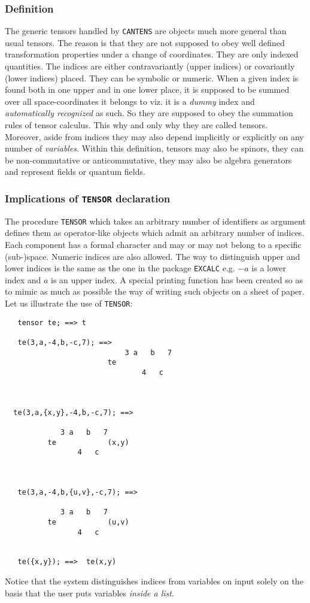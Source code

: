 \subsubsection{Definition}
The generic tensors  handled by \texttt{CANTENS} are objects
much more general than usual tensors. The reason is that they are not supposed to
obey well defined transformation properties under a change of coordinates.
They are only indexed quantities. The indices are either
contravariantly (upper indices) or covariantly (lower indices) placed.
They can be symbolic or numeric. When a given index is found both
in one upper and in one lower place, it is supposed to be summed over
all space-coordinates it belongs to viz. it is a \emph{dummy}
index
and \emph{automatically recognized} as such.
So they are supposed to obey the summation rules of tensor calculus.
This why and only why they are called tensors. Moreover, aside from
indices they may also depend implicitly or explicitly on any number of
\emph{variables}. Within this definition,
tensors may also be spinors, they can be non-commutative or anticommutative,
they may also be algebra generators and represent fields or quantum fields.

\subsubsection{Implications of \texttt{TENSOR} declaration}

The procedure \texttt{TENSOR} which takes an arbitrary number of identifiers as argument
defines them as operator-like objects which admit an arbitrary number of indices.
Each component has a formal character and may or may not belong to a
specific (sub-)space. Numeric indices are also allowed. The way to distinguish
upper and lower indices is the same as the one in the package
\texttt{EXCALC} e.g. $-a$ is a lower index and $a$ is an
upper index.
A special printing function has been created so as to mimic as much as possible
the way of writing such objects on a sheet of paper.
Let us illustrate the use of \texttt{TENSOR}:
\begin{verbatim}
   tensor te; ==> t

   te(3,a,-4,b,-c,7); ==>
                            3 a   b   7
                        te
                                4   c



  te(3,a,{x,y},-4,b,-c,7); ==>

             3 a   b   7
          te            (x,y)
                 4   c



   te(3,a,-4,b,{u,v},-c,7); ==>

             3 a   b   7
          te            (u,v)
                 4   c


   te({x,y}); ==>  te(x,y)
\end{verbatim} 
Notice that the system distinguishes indices from variables on input
solely on the basis that the user puts variables \emph{inside a list}.

